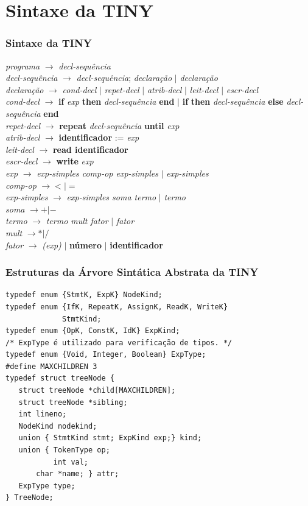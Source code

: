 \documentclass[table]{beamer}
\begin{document}
\section{Sintaxe da TINY}
\begin{frame}
   \frametitle{Sintaxe da TINY}
   \textit{programa} $\to$ \textit{decl-sequência} \\
   \textit{decl-sequência} $\to$ \textit{decl-sequência}; \textit{declaração} $|$ \textit{declaração} \\
   \textit{declaração} $\to$ \textit{cond-decl} $|$ \textit{repet-decl} $|$ \textit{atrib-decl} $|$ \textit{leit-decl} $|$ \textit{escr-decl} \\
   \textit{cond-decl} $\to$ \textbf{if} \textit{exp} \textbf{then} \textit{decl-sequência} \textbf{end}
   $|$ \textbf{if}  \textbf{then} \textit{decl-sequência} \textbf{else} \textit{decl-sequência} \textbf{end} \\
   \textit{repet-decl} $\to$ \textbf{repeat} \textit{decl-sequência} \textbf{until} \textit{exp} \\
   \textit{atrib-decl} $\to$ \textbf{identificador} := \textit{exp} \\
   \textit{leit-decl} $\to$ \textbf{read identificador} \\
   \textit{escr-decl} $\to$ \textbf{write} \textit{exp} \\
   \textit{exp} $\to$ \textit{exp-simples comp-op exp-simples} $|$ \textit{exp-simples} \\
   \textit{comp-op} $\to <|=$ \\
   \textit{exp-simples} $\to$ \textit{exp-simples soma termo} $|$ \textit{termo} \\
   \textit{soma} $\to +|-$ \\
   \textit{termo} $\to$ \textit{termo mult fator} $|$ \textit{fator} \\
   \textit{mult} $\to *|/$ \\
   \textit{fator} $\to$ \textit{(exp)} $|$ \textbf{número} $|$ \textbf{identificador}
\end{frame}

\begin{frame}[fragile]
   \frametitle{Estruturas da Árvore Sintática Abstrata da TINY}
   \footnotesize
   \begin{verbatim}
typedef enum {StmtK, ExpK} NodeKind;
typedef enum {IfK, RepeatK, AssignK, ReadK, WriteK} 
             StmtKind;
typedef enum {OpK, ConstK, IdK} ExpKind;
/* ExpType é utilizado para verificação de tipos. */	     
typedef enum {Void, Integer, Boolean} ExpType;
#define MAXCHILDREN 3
typedef struct treeNode {
   struct treeNode *child[MAXCHILDREN];
   struct treeNode *sibling;
   int lineno;
   NodeKind nodekind;
   union { StmtKind stmt; ExpKind exp;} kind;
   union { TokenType op;
           int val;
	   char *name; } attr;
   ExpType type;
} TreeNode;
   \end{verbatim}
\end{frame}
\end{document}
